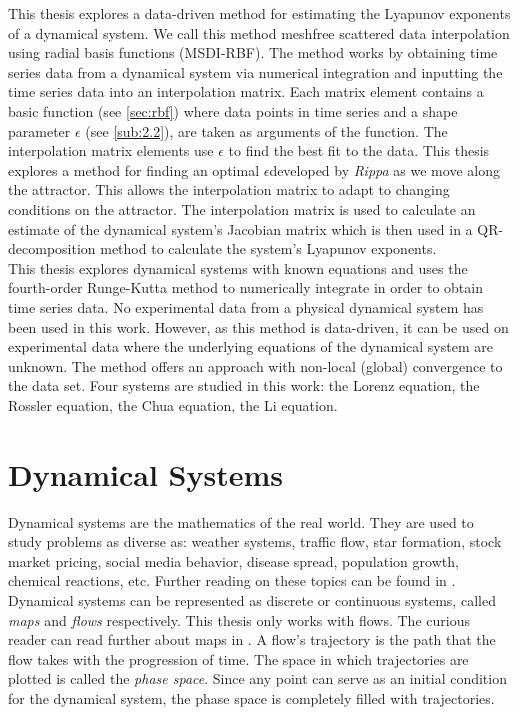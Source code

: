       This thesis explores a data-driven method for estimating the Lyapunov exponents of a dynamical system. We call this method
      meshfree scattered data interpolation using radial basis functions (MSDI-RBF). The method works by obtaining
      time series data from a dynamical system via numerical integration and inputting the time series data into an interpolation matrix. Each matrix
      element contains a basic function (see \textsection\ref{sec:rbf}) where data points in time series and a shape parameter $\epsilon$ (see \textsection\ref{sub:2.2}),
      are taken as arguments of the function. The interpolation matrix elements use $\epsilon$ to find the best fit to the data.
      This thesis explores a method for finding an optimal $\epsilon$\texttwelveudash developed by \textit{Rippa} \cite{item:3}\texttwelveudash as we move along the attractor.
      This allows
      the interpolation matrix to adapt to changing conditions on the attractor. The interpolation matrix is used
      to calculate an estimate of the dynamical system's Jacobian matrix which is then used in a QR-decomposition
      method to calculate the system's Lyapunov exponents.\\

      This thesis explores dynamical systems with known equations and uses the fourth-order Runge-Kutta method to numerically integrate
      in order to obtain time series data. No experimental data from a physical dynamical system has been used
      in this work. However, as this method is data-driven, it can be used
      on experimental data where the underlying equations of the dynamical system are unknown. The method offers an approach
      with non-local (global) convergence to the data set. Four systems are studied in this work: the Lorenz equation, the Rossler equation,
      the Chua equation, the Li equation.\\

  \section{Dynamical Systems}

      Dynamical systems are the mathematics of the real world. They are used to study problems as diverse as:
      weather systems, traffic flow, star formation, stock market pricing, social media behavior, disease spread, population growth, chemical reactions, etc.
      Further reading on these topics can be found in \cite{item:16}\cite{item:2}. Dynamical systems can be represented
      as discrete or continuous systems, called \textit{maps} and \textit{flows} respectively. This thesis only
      works with flows. The curious reader can read further about maps in \cite{item:17}.
      A flow's trajectory is the path that the flow takes with the progression of time. The space in which trajectories
      are plotted is called the \textit{phase space}. Since any point can serve as an initial condition for the
      dynamical system, the phase space is completely filled with trajectories.\\

